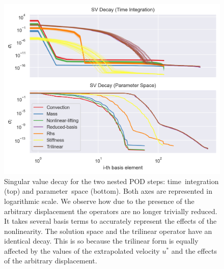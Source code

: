 \documentclass[../../thesis.tex]{subfiles}
\begin{document}
\begin{figure}[h]
    \includegraphics[width =\columnwidth]{research_project/piston/figures/nonlinear_displacement/separable/sigmas_loglog.png}
    \caption{Singular value decay for the two nested POD steps: 
    \mbox{time integration} (top) and \mbox{parameter space} (bottom).
    Both axes are represented in logarithmic scale.
    We observe how due to the presence of the arbitrary displacement
    the operators are no longer trivially reduced.
    It takes several basis terms to accurately represent 
    the effects of the nonlinearity.
    The solution space and the trilinear operator have an identical decay.
    This is so because the trilinear form is equally affected by the 
    values of the extrapolated velocity $u^{*}$ 
    and the effects of the arbitrary displacement.}
    \label{fig:nlinear_disp_sep_loglog}
\end{figure}
\end{document}
